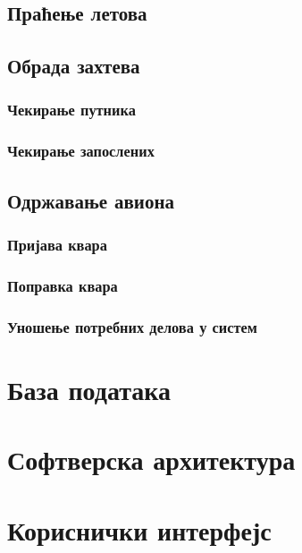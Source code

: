 \documentclass{article}
\begin{document}
\subsection{Праћење летова}

\subsection{Обрада захтева}

\subsubsection{Чекирање путника}

\subsubsection{Чекирање запослених}

\subsection{Одржавање авиона}

\subsubsection{Пријава квара}

\subsubsection{Поправка квара}

\subsubsection{Уношење потребних делова у систем}

\section{База података}

\section{Софтверска архитектура}

\section{Кориснички интерфејс}

\newpage

 
\end{document}
